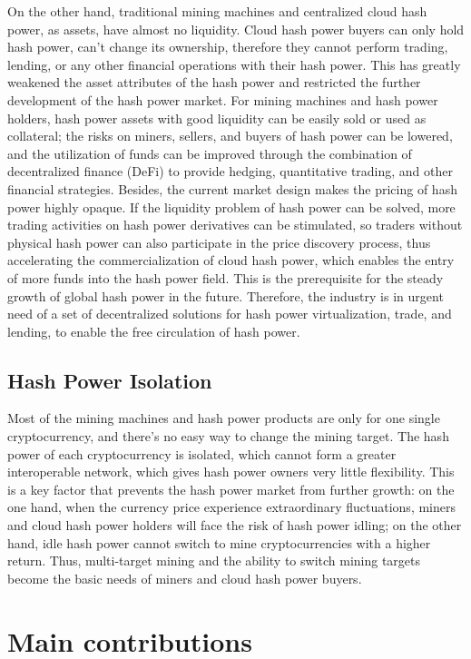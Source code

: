 \documentclass[]{template/llncs}
\begin{document}
On the other hand, traditional mining machines and centralized cloud hash power, as assets, have almost no liquidity. Cloud hash power buyers can only hold hash power, can't change its ownership, therefore they cannot perform trading, lending, or any other financial operations with their hash power. This has greatly weakened the asset attributes of the hash power and restricted the further development of the hash power market. For mining machines and hash power holders, hash power assets with good liquidity can be easily sold or used as collateral; the risks on miners, sellers, and buyers of hash power can be lowered, and the utilization of funds can be improved through the combination of decentralized finance (DeFi) to provide hedging, quantitative trading, and other financial strategies. Besides, the current market design makes the pricing of hash power highly opaque. If the liquidity problem of hash power can be solved, more trading activities on hash power derivatives can be stimulated, so traders without physical hash power can also participate in the price discovery process, thus accelerating the commercialization of cloud hash power, which enables the entry of more funds into the hash power field. This is the prerequisite for the steady growth of global hash power in the future. Therefore, the industry is in urgent need of a set of decentralized solutions for hash power virtualization, trade, and lending, to enable the free circulation of hash power.

\subsection{Hash Power Isolation}

Most of the mining machines and hash power products are only for one single cryptocurrency, and there’s no easy way to change the mining target. The hash power of each cryptocurrency is isolated, which cannot form a greater interoperable network, which gives hash power owners very little flexibility. This is a key factor that prevents the hash power market from further growth: on the one hand, when the currency price experience extraordinary fluctuations, miners and cloud hash power holders will face the risk of hash power idling; on the other hand, idle hash power cannot switch to mine cryptocurrencies with a higher return. Thus, multi-target mining and the ability to switch mining targets become the basic needs of miners and cloud hash power buyers.


\section{Main contributions}
\end{document}
